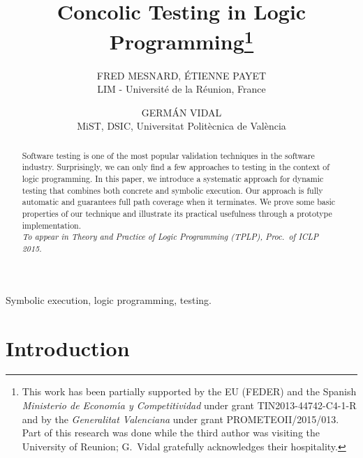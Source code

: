 \documentclass[fleqn]{tlp}
\begin{document}
\title[Concolic Testing in Logic Programming]{Concolic Testing in Logic Programming\thanks{This work has been partially supported by the EU (FEDER) and
    the Spanish \emph{Ministerio de Econom\'{\i}a y Competitividad}
    under grant TIN2013-44742-C4-1-R and by the \emph{Generalitat
      Valenciana} under grant PROMETEOII/2015/013. 
Part of this research was done while the third author was visiting
    the University of Reunion; G.\ Vidal gratefully acknowledges their
    hospitality.}  }

\author[F.~Mesnard and \'E.~Payet and G.~Vidal]
{FRED MESNARD, \'ETIENNE PAYET \\
  LIM - Universit\'e de la R\'eunion, France\\
\and
GERM\'AN VIDAL \\
MiST, DSIC, Universitat Polit\`ecnica de Val\`encia\\
}



\maketitle

\label{firstpage}

\begin{abstract}
  Software testing is one of the most popular validation techniques in
  the software industry. Surprisingly, we can only find a few
  approaches to testing in the context of logic programming.
In this paper, we introduce a systematic approach for dynamic
  testing that combines both concrete and symbolic execution. Our
  approach is fully automatic and guarantees full path coverage when
  it terminates.
We prove some basic properties of our technique and illustrate its
  practical usefulness through a prototype implementation.\\
  
  \noindent
  \emph{To appear in Theory and Practice of Logic Programming (TPLP),
  Proc.\ of ICLP 2015.}\\
\end{abstract}

\begin{keywords}
 Symbolic execution, logic programming, testing.
\end{keywords}

\section{Introduction} \label{intro}
\end{document}
